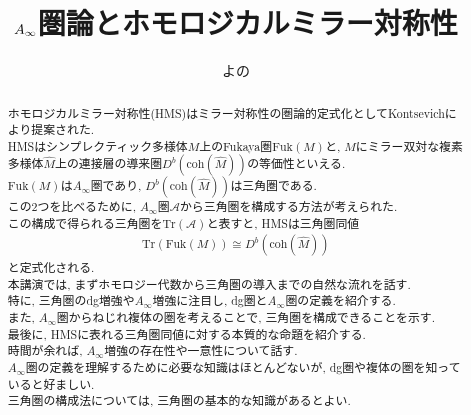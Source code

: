 \documentclass[uplatex, a4paper, 12pt, dvipdfmx]{jsarticle}
\title{$\Ainf$圏論とホモロジカルミラー対称性}
\author{よの}
\date{}
\theoremstyle{jplain}
\numberwithin{theorem}{subsection}
\numberwithin{equation}{subsection}
\newcommand{\A}{\mathcal{A}}
\newcommand{\coh}{\mathrm{coh}}
\newcommand{\Fuk}{\mathrm{Fuk}}
\renewcommand{\Tr}{\mathrm{Tr}}
\newcommand{\Ainf}{A_{\infty}}
\begin{document}
\maketitle

\begin{abstract}
  ホモロジカルミラー対称性(HMS)はミラー対称性の圏論的定式化としてKontsevichにより提案された. \\
  HMSはシンプレクティック多様体$M$上のFukaya圏$\Fuk(M)$と, $M$にミラー双対な複素多様体$\hat{M}$上の連接層の導来圏$D^b(\coh(\hat{M}))$の等価性といえる. \\
  $\Fuk(M)$は$\Ainf$圏であり, $D^b(\coh(\hat{M}))$は三角圏である. \\
  この2つを比べるために, $\Ainf$圏$\A$から三角圏を構成する方法が考えられた. \\
  この構成で得られる三角圏を$\Tr(\A)$と表すと, HMSは三角圏同値
  \begin{align*}
    \Tr(\Fuk(M)) \cong D^b(\coh(\hat{M}))
  \end{align*}
  と定式化される. \\

  本講演では, まずホモロジー代数から三角圏の導入までの自然な流れを話す. \\
  特に, 三角圏のdg増強や$\Ainf$増強に注目し, dg圏と$\Ainf$圏の定義を紹介する. \\
  また, $\Ainf$圏からねじれ複体の圏を考えることで, 三角圏を構成できることを示す. \\
  最後に, HMSに表れる三角圏同値に対する本質的な命題を紹介する. \\
  時間が余れば, $\Ainf$増強の存在性や一意性について話す. \\

  $\Ainf$圏の定義を理解するために必要な知識はほとんどないが, dg圏や複体の圏を知っていると好ましい. \\
  三角圏の構成法については, 三角圏の基本的な知識があるとよい. \\
\end{abstract}
\end{document}
